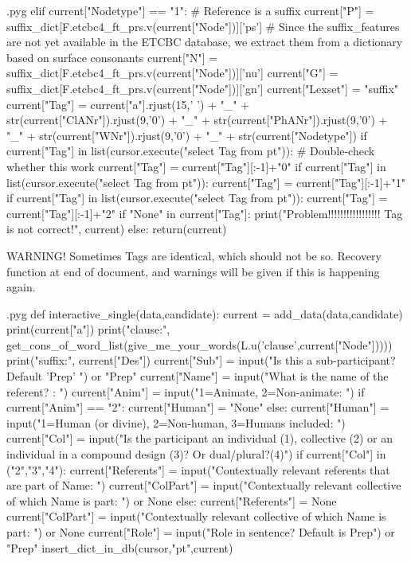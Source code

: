 \documentclass{report}
\makeatletter
\newenvironment{python}{%
  \VerbatimEnvironment
  \minted@resetoptions
  \setkeys{minted@opt}{}
      \begin{VerbatimOut}{\jobname.pyg}}
{%
      \end{VerbatimOut}
      \minted@pygmentize{python}
      \DeleteFile{\jobname.pyg}}
\makeatother
\begin{document}
\begin{python}
    elif current["Nodetype"] == "1": # Reference is a suffix
        current["P"] = suffix_dict[F.etcbc4_ft_prs.v(current["Node"])]['ps']    # Since the suffix_features are not yet available in the ETCBC database, we extract them from a dictionary based on surface consonants
        current["N"] = suffix_dict[F.etcbc4_ft_prs.v(current["Node"])]['nu']
        current["G"] = suffix_dict[F.etcbc4_ft_prs.v(current["Node"])]['gn']
        current["Lexset"] = "suffix"
    current["Tag"] = current["a"].rjust(15,' ') + "_" + str(current["ClANr"]).rjust(9,'0') + "_" + str(current["PhANr"]).rjust(9,'0') + "_" + str(current["WNr"]).rjust(9,'0') + "_" + str(current["Nodetype"])
    if current["Tag"] in list(cursor.execute("select Tag from pt")): # Double-check whether this work
        current["Tag"] = current["Tag"][:-1]+"0"
        if current["Tag"] in list(cursor.execute("select Tag from pt")):
            current["Tag"] = current["Tag"][:-1]+"1"
            if current["Tag"] in list(cursor.execute("select Tag from pt")):
                current["Tag"] = current["Tag"][:-1]+"2"
    if "None" in current["Tag"]:
        print("Problem!!!!!!!!!!!!!!!!! Tag is not correct!", current)
    else:
        return(current)

\end{python}

WARNING! Sometimes Tags are identical, which should not be so. Recovery function at end of document, and warnings will be given if this is happening again.

\begin{python}
def interactive_single(data,candidate):
    current = add_data(data,candidate)
    print(current["a"])
    print("clause:", get_cons_of_word_list(give_me_your_words(L.u('clause',current["Node"])))) 
    print("suffix:", current["Des"])
    current["Sub"] = input("Is this a sub-participant? Default 'Prep' ") or "Prep" 
    current["Name"] = input("What is the name of the referent? : ")
    current["Anim"] = input("1=Animate, 2=Non-animate: ")
    if current["Anim"] == "2":
        current["Human"] = "None"
    else:
        current["Human"] = input("1=Human (or divine), 2=Non-human, 3=Humans included: ")
    current["Col"] = input("Is the participant an individual (1), collective (2) or an individual in a compound design (3)? Or dual/plural?(4)")
    if current["Col"] in ("2","3","4"):
        current["Referents"] = input("Contextually relevant referents that are part of Name: ")
        current["ColPart"] = input("Contextually relevant collective of which Name is part: ") or None
    else:
        current["Referents"] = None
        current["ColPart"] = input("Contextually relevant collective of which Name is part: ") or None
    current["Role"] = input("Role in sentence? Default is Prep") or "Prep" 
    insert_dict_in_db(cursor,"pt",current)

\end{python}
\end{document}
